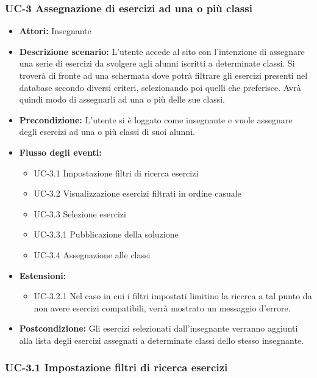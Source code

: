 \subsubsection{UC-3 Assegnazione di esercizi ad una o più classi}
	\begin{itemize}
		\item \textbf{Attori: } Insegnante
		\item \textbf{Descrizione scenario: } L'utente accede al sito con l'intenzione di assegnare una serie di esercizi da svolgere agli alunni iscritti a determinate classi. Si troverà di fronte ad una schermata dove potrà filtrare gli esercizi presenti nel database secondo diversi criteri, selezionando poi quelli che preferisce. Avrà quindi modo di assegnarli ad una o più delle sue classi. 
		\item \textbf{Precondizione: } L'utente si è loggato come insegnante e vuole assegnare degli esercizi ad una o più classi di suoi alunni. 
		\item \textbf{Flusso degli eventi: }
		\begin{itemize}
		\item UC-3.1 Impostazione filtri di ricerca esercizi
		\item UC-3.2 Visualizzazione esercizi filtrati in ordine casuale
		\item UC-3.3 Selezione esercizi
		\item UC-3.3.1 Pubblicazione della soluzione
		\item UC-3.4 Assegnazione alle classi
		\end{itemize}
		\item \textbf{Estensioni: }
		\begin{itemize}
		\item UC-3.2.1 Nel caso in cui i filtri impostati limitino la ricerca a tal punto da non avere esercizi compatibili, verrà mostrato un messaggio d'errore. 
		\end{itemize} 
		\item \textbf{Postcondizione: } Gli esercizi selezionati dall'insegnante verranno aggiunti alla lista degli esercizi assegnati a determinate classi dello stesso insegnante.
	\end{itemize}
\subsubsection{UC-3.1 Impostazione filtri di ricerca esercizi}

